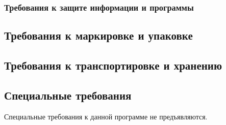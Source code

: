     \subsubsection{Требования к защите информации и программы}

\subsection{Требования к маркировке и упаковке}

\subsection{Требования к транспортировке и хранению}

\subsection{Специальные требования}
    Специальные требования к данной программе не предъявляются.

\clearpage